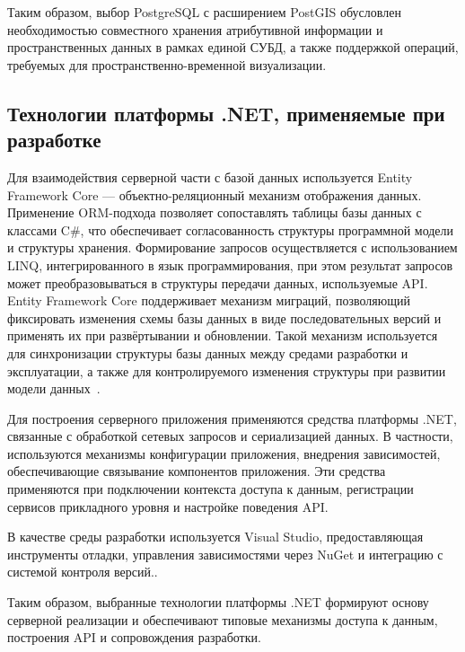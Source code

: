 Таким образом, выбор PostgreSQL с расширением PostGIS обусловлен необходимостью совместного хранения атрибутивной информации и пространственных данных в рамках единой СУБД, а также поддержкой операций, требуемых для пространственно-временной визуализации.

\subsection{Технологии платформы .NET, применяемые при разработке}

Для взаимодействия серверной части с базой данных используется Entity Framework Core — объектно-реляционный механизм отображения данных. Применение ORM-подхода позволяет сопоставлять таблицы базы данных с классами C\#, что обеспечивает согласованность структуры программной модели и структуры хранения. Формирование запросов осуществляется с использованием LINQ, интегрированного в язык программирования, при этом результат запросов может преобразовываться в структуры передачи данных, используемые API. Entity Framework Core поддерживает механизм миграций, позволяющий фиксировать изменения схемы базы данных в виде последовательных версий и применять их при развёртывании и обновлении. Такой механизм используется для синхронизации структуры базы данных между средами разработки и эксплуатации, а также для контролируемого изменения структуры при развитии модели данных~\cite{efcore_overview}.

Для построения серверного приложения применяются средства платформы .NET, связанные с обработкой сетевых запросов и сериализацией данных. В частности, используются механизмы конфигурации приложения, внедрения зависимостей, обеспечивающие связывание компонентов приложения. Эти средства применяются при подключении контекста доступа к данным, регистрации сервисов прикладного уровня и настройке поведения API.

В качестве среды разработки используется Visual Studio, предоставляющая инструменты отладки, управления зависимостями через NuGet и интеграцию с системой контроля версий..

Таким образом, выбранные технологии платформы .NET формируют основу серверной реализации и обеспечивают типовые механизмы доступа к данным, построения API и сопровождения разработки.
